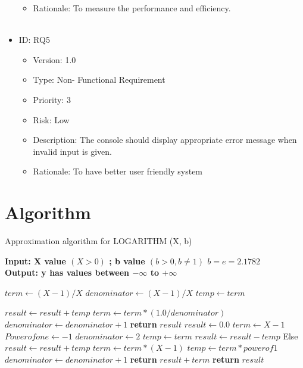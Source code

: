 \documentclass[12pt]{report}
\begin{document}
\begin{itemize}
\begin{itemize}
\item Rationale: To measure the performance and efficiency.
\\\\
\end{itemize}
\item ID: RQ5
\begin{itemize}
\item Version:  1.0
\item Type: Non- Functional Requirement
\item Priority: 3
\item Risk: Low
\item Description: The console should display appropriate error message when invalid input is given.
\item Rationale: To have better user friendly system
\end{itemize}
\end{itemize}





\pagebreak
\section{Algorithm}
\begin{algorithm}
\caption{Approximation algorithm for LOGARITHM (X, b)}
\textbf{Input: X value $(X > 0)$   ; b value $(b>0, b \neq 1)$  $b=e=2.1782$}\\
\textbf{Output: y has values between $-\infty$ to $+ \infty$ }
\begin{algorithmic}[1]
  \State $term \gets (X-1)/X$
  \State $denominator  \gets (X-1)/X$
  \State $temp \gets term$

\State $result\gets result+temp$
\State $term\gets term* (1.0/denominator)$
\State $denominator\gets denominator+1$
\EndWhile\label{algorithmendwhile}
\State \textbf{return} $result$
\EndIf
{}
  \State $result \gets 0.0$
  \State $term  \gets X-1$
  \State $Power of one \gets -1$
  \State $denominator\gets 2$
  \State $temp  \gets term$
    \State $result\gets result-temp$
    \EndIf
\EndWhile
\EndIf
\State Else
\State $result\gets result+temp$
\State $term\gets term* (X-1)$
\State $temp\gets term* power of 1$
\State $denominator\gets denominator+1$
\State \textbf{return} $result+term$
\State \textbf{return} $result$
\EndProcedure
\end{algorithmic}
\end{algorithm}
\end{document}
